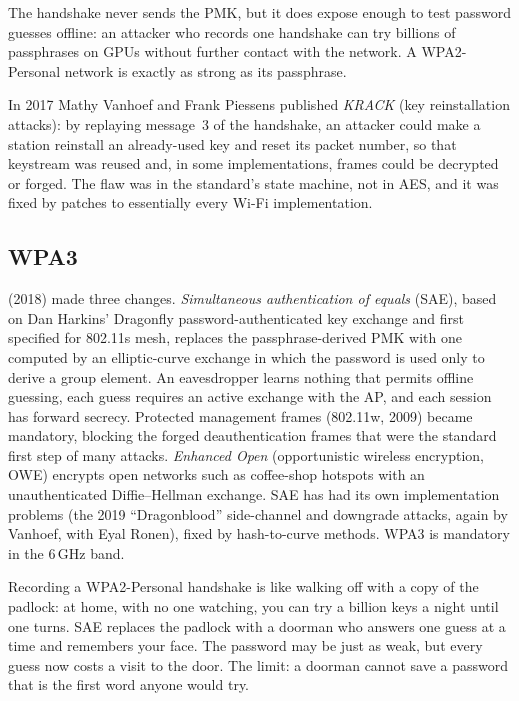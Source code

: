 The handshake never sends the PMK, but it does expose enough to test password guesses offline: an
attacker who records one handshake can try billions of passphrases on GPUs without further contact
with the network. A WPA2-Personal network is exactly as strong as its passphrase.

In 2017 Mathy Vanhoef and Frank Piessens published \emph{KRACK} (key reinstallation attacks): by
replaying message~3 of the handshake, an attacker could make a station reinstall an already-used key
and reset its packet number, so that keystream was reused and, in some implementations, frames could
be decrypted or forged. The flaw was in the standard's state machine, not in AES, and it was fixed by
patches to essentially every Wi-Fi implementation.

\subsection{WPA3}

 (2018) made three changes. \emph{Simultaneous authentication of equals} (SAE), based on
Dan Harkins' Dragonfly password-authenticated key exchange and first specified for 802.11s mesh,
replaces the passphrase-derived PMK with one computed by an elliptic-curve exchange in which the
password is used only to derive a group element. An eavesdropper learns nothing that permits offline
guessing, each guess requires an active exchange with the AP, and each session has forward secrecy.
Protected management frames (802.11w, 2009) became mandatory, blocking the forged deauthentication
frames that were the standard first step of many attacks. \emph{Enhanced Open} (opportunistic
wireless encryption, OWE) encrypts open networks such as coffee-shop hotspots with an unauthenticated
Diffie--Hellman exchange. SAE has had its own implementation problems (the 2019 ``Dragonblood''
side-channel and downgrade attacks, again by Vanhoef, with Eyal Ronen), fixed by hash-to-curve
methods. WPA3 is mandatory in the 6\,GHz band.

\begin{analogy}
Recording a WPA2-Personal handshake is like walking off with a copy of the padlock: at home, with no
one watching, you can try a billion keys a night until one turns. SAE replaces the padlock with a
doorman who answers one guess at a time and remembers your face. The password may be just as weak,
but every guess now costs a visit to the door. The limit: a doorman cannot save a password that is
the first word anyone would try.
\end{analogy}


